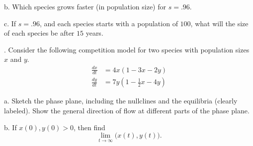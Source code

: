 \documentclass[reqno,12pt]{amsart}
\def \dxdt{\frac{dx}{dt}}
\def \dydt{\frac{dy}{dt}}
\begin{document}
\noindent
b.  Which species grows faster (in population size) for $s=.96$.

\noindent
c.  If $s=.96$, and each species starts with a population of
$100$, what will the size of each species be after $15$ years.

\vspace{1cm}

.  Consider the following competition model for two species with
population sizes $x$ and $y$.
\begin{align*}
\dxdt &= 4 x (1 - 3x -2y) \\
\dydt &= 7 y (1 - \frac 12 x - 4y)
\end{align*}

\noindent
a.  Sketch the phase plane, including the nullclines and the
equilibria (clearly labeled).  Show the general direction of
flow at different parts of the phase plane.

\noindent
b.  If $x(0), y(0) > 0$, then find
$$
\lim_{t \to \infty} \bigl( x(t), y(t) \bigr).
$$
\end{document}
